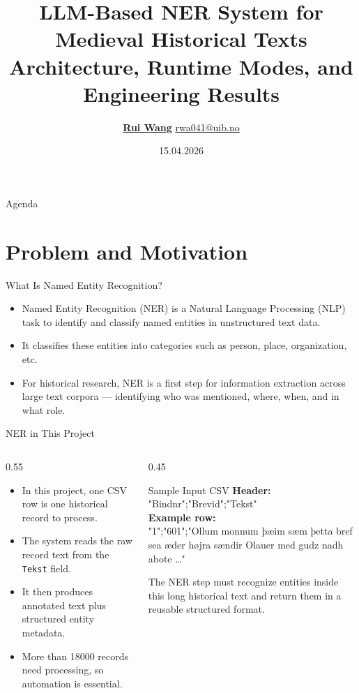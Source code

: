 \documentclass[
        11pt,
        compress,
        xcolor={dvipsnames}
    ]{beamer}
\title[LLM-Based NER System]{\large LLM-Based NER System for Medieval Historical Texts\\[0.2em]\small Architecture, Runtime Modes, and Engineering Results}
\author[\underline{Wang}]%
{\texorpdfstring{\underline{\textbf{Rui Wang}}\inst{1} \newline \small \url{rwa041@uib.no} \\[0.1cm] }
  {R. Wang}}
\institute{
  \textbf{\inst{1} Digital development group, education and research support section,
    \newline \hspace{0.2cm}
    \vspace{0.3cm}
  University of Bergen Library, Bergen, Norway \newline
  }
}
\date[AI-NER]{15.04.2026}
\begin{document}
\begin{frame}[plain]
	\titlepage
\end{frame}


\begin{frame}{Agenda}
  \tableofcontents[hideallsubsections]
\end{frame}

\section{Problem and Motivation}

\begin{frame}{What Is Named Entity Recognition?}
  \begin{itemize}
    \item Named Entity Recognition (NER) is a Natural Language Processing (NLP) task to
    identify and classify named entities in unstructured text data.
    \item It classifies these entities into categories such as person, place, organization, etc.
    \item For historical research, NER is a first step for information extraction across large text corpora — identifying who was mentioned, where, when, and in what role.
  \end{itemize}
\end{frame}

\begin{frame}{NER in This Project}
  \begin{columns}[T]
    \begin{column}{0.55\textwidth}
      \begin{itemize}
        \item In this project, one CSV row is one historical record to process.
        \item The system reads the raw record text from the \texttt{Tekst} field.
        \item It then produces annotated text plus structured entity metadata.
        \item More than 18000 records need processing, so automation is essential.
      \end{itemize}
    \end{column}
    \begin{column}{0.45\textwidth}
      \begin{block}{Sample Input CSV}
        \scriptsize
        \textbf{Header:}\\
        "Bindnr";"Brevid";"Tekst"\\[0.4em]
        \textbf{Example row:}\\
        "1";"601";"Ollum monnum þæim sæm þetta bref sea æder højra sændir Olauer med gudz nadh abote \ldots"
      \end{block}
      \vspace{0.2cm}
      \scriptsize
      The NER step must recognize entities inside this long historical text and
      return them in a reusable structured format.
    \end{column}
  \end{columns}
\end{frame}
\end{document}
